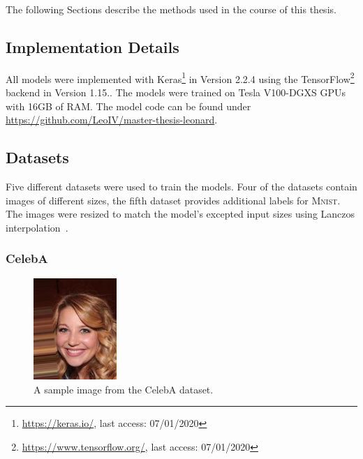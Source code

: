 The following Sections describe the methods used in the course of this thesis.

\subsection{Implementation Details}\label{subsec:implementation-details}

All models were implemented with Keras\footnote{\href{https://keras.io/}{https://keras.io/}, last access: 07/01/2020} in Version 2.2.4 using the TensorFlow\footnote{\href{https://www.tensorflow.org/}{https://www.tensorflow.org/}, last access: 07/01/2020} backend in Version 1.15..
The models were trained on Tesla V100-DGXS GPUs with 16GB of RAM.
The model code can be found under \href{https://github.com/LeoIV/master-thesis-leonard}{https://github.com/LeoIV/master-thesis-leonard}.

\subsection{Datasets}\label{subsec:datasets}

Five different datasets were used to train the models.
Four of the datasets contain images of different sizes, the fifth dataset provides additional labels for \textsc{Mnist}.
The images were resized to match the model's excepted input sizes using Lanczos interpolation~\citep[pp. 223, ff]{burger2009principles}.

\subsubsection{CelebA}

\begin{figure}
    \begin{center}
        \includegraphics[width=0.28\textwidth]{images/celeba_sample_63.jpg}
    \end{center}
    \caption[CelebA dataset sample image]{A sample image from the CelebA dataset.}
    \label{fig:celeba_sample}
\end{figure}

